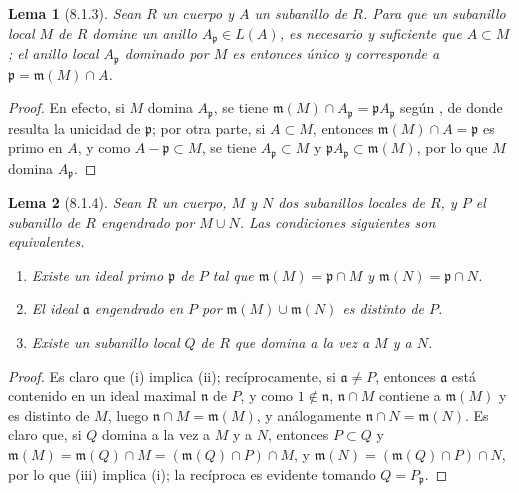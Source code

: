 \documentclass[oneside]{amsart}
\theoremstyle{ega-env-style}
\theoremstyle{ega-thm-env-style}
\newtheorem*{lemma}{Lema}
\theoremstyle{ega-defn-env-style}
\def\setmin{-}                      %
\newcommand{\oldpage}[2][]{{\marginnote{\normalfont{\textbf{#1}~|~#2}}}\ignorespaces}
\let\EGAOriginalLabel\label
\renewcommand{\label}[1]{\phantomsection\EGAOriginalLabel{#1}}
\begin{document}
\begin{lemma}[8.1.3]
\label{I.8.1.3}
Sean $R$ un cuerpo y $A$ un subanillo de $R$.
Para que un subanillo local $M$ de $R$ domine un anillo $A_\mathfrak p\in L(A)$, es necesario y suficiente que $A\subset M$;
el anillo local $A_\mathfrak p$ dominado por $M$ es entonces único y corresponde a $\mathfrak p=\mathfrak m(M)\cap A$.
\end{lemma}

\begin{proof}
En efecto, si $M$ domina $A_\mathfrak p$, se tiene $\mathfrak m(M)\cap A_\mathfrak p=\mathfrak p A_\mathfrak p$ según , de donde resulta la unicidad de $\mathfrak p$;
por otra parte, si $A\subset M$, entonces $\mathfrak m(M)\cap A=\mathfrak p$ es primo en $A$, y como $A\setmin\mathfrak p\subset M$, se tiene $A_\mathfrak p\subset M$ y $\mathfrak p A_\mathfrak p\subset\mathfrak m(M)$, por lo que $M$ domina $A_\mathfrak p$.
\end{proof}

\oldpage[I]{165}
\begin{lemma}[8.1.4]
\label{I.8.1.4}
Sean $R$ un cuerpo, $M$ y $N$ dos subanillos locales de $R$, y $P$ el subanillo de $R$ engendrado por $M\cup N$.
Las condiciones siguientes son equivalentes.
\begin{enumerate}
  \item[{\rm(i)}] Existe un ideal primo $\mathfrak p$ de $P$ tal que $\mathfrak m(M)=\mathfrak p\cap M$ y $\mathfrak m(N)=\mathfrak p\cap N$.
  \item[{\rm(ii)}] El ideal $\mathfrak a$ engendrado en $P$ por $\mathfrak m(M)\cup\mathfrak m(N)$ es distinto de $P$.
  \item[{\rm(iii)}] Existe un subanillo local $Q$ de $R$ que domina a la vez a $M$ y a $N$.
\end{enumerate}
\end{lemma}

\begin{proof}
Es claro que (i) implica (ii);
recíprocamente, si $\mathfrak a\ne P$, entonces $\mathfrak a$ está contenido en un ideal maximal $\mathfrak n$ de $P$, y como $1\notin\mathfrak n$, $\mathfrak n\cap M$ contiene a $\mathfrak m(M)$ y es distinto de $M$, luego $\mathfrak n\cap M=\mathfrak m(M)$, y análogamente $\mathfrak n\cap N=\mathfrak m(N)$.
Es claro que, si $Q$ domina a la vez a $M$ y a $N$, entonces $P\subset Q$ y $\mathfrak m(M)=\mathfrak m(Q)\cap M=(\mathfrak m(Q)\cap P)\cap M$, y $\mathfrak m(N)=(\mathfrak m(Q)\cap P)\cap N$, por lo que (iii) implica (i);
la recíproca es evidente tomando $Q=P_\mathfrak p$.
\end{proof}
\end{document}

